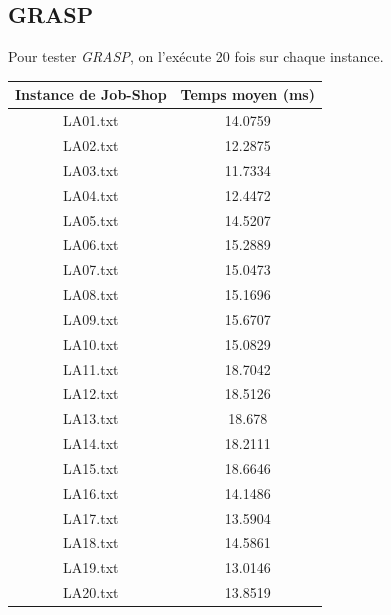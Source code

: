 \documentclass{article}
\begin{document}
\newpage
\subsection{GRASP}
Pour tester \emph{GRASP}, on l'exécute 20 fois sur chaque instance.

\begin{center}
  \begin{tabular}{ | c | c | }
    \hline
    Instance de Job-Shop & Temps moyen (ms) \\
    \hline
    \hline
    LA01.txt & 14.0759 \\ \hline
    LA02.txt & 12.2875 \\ \hline
    LA03.txt & 11.7334 \\ \hline
    LA04.txt & 12.4472 \\ \hline
    LA05.txt & 14.5207 \\ \hline
    LA06.txt & 15.2889 \\ \hline
    LA07.txt & 15.0473 \\ \hline
    LA08.txt & 15.1696 \\ \hline
    LA09.txt & 15.6707 \\ \hline
    LA10.txt & 15.0829 \\ \hline
    LA11.txt & 18.7042 \\ \hline
    LA12.txt & 18.5126 \\ \hline
    LA13.txt & 18.678 \\ \hline
    LA14.txt & 18.2111 \\ \hline
    LA15.txt & 18.6646 \\ \hline
    LA16.txt & 14.1486 \\ \hline
    LA17.txt & 13.5904 \\ \hline
    LA18.txt & 14.5861 \\ \hline
    LA19.txt & 13.0146 \\ \hline
    LA20.txt & 13.8519 \\ \hline
  \end{tabular}
\end{center}
\end{document}
